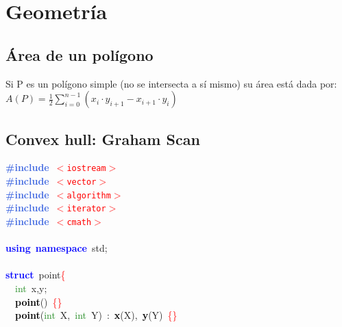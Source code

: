 \documentclass[10pt,a4paper,twoside]{article}
\begin{document}
{{{{{{{{{} \normalfont\normalsize

\section{Geometría}
\subsection{Área de un polígono}
Si P es un polígono simple (no se intersecta a sí mismo) su área está dada por: \\

$ A(P) = \frac{1}{2} \displaystyle\sum_{i=0}^{n-1} (x_{i} \cdot y_{i+1} - x_{i+1} \cdot y_{i}) $ \\

\subsection{Convex hull: Graham Scan}
{\ttfamily \raggedright {
\noindent
\mbox{}\textbf{\textcolor{RoyalBlue}{\#include}}\ \texttt{\textcolor{Red}{$<$iostream$>$}} \\
\mbox{}\textbf{\textcolor{RoyalBlue}{\#include}}\ \texttt{\textcolor{Red}{$<$vector$>$}} \\
\mbox{}\textbf{\textcolor{RoyalBlue}{\#include}}\ \texttt{\textcolor{Red}{$<$algorithm$>$}} \\
\mbox{}\textbf{\textcolor{RoyalBlue}{\#include}}\ \texttt{\textcolor{Red}{$<$iterator$>$}} \\
\mbox{}\textbf{\textcolor{RoyalBlue}{\#include}}\ \texttt{\textcolor{Red}{$<$cmath$>$}} \\
\mbox{} \\
\mbox{}\textbf{\textcolor{Blue}{using}}\ \textbf{\textcolor{Blue}{namespace}}\ std\textcolor{BrickRed}{;} \\
\mbox{} \\
\mbox{}\textbf{\textcolor{Blue}{struct}}\ point\textcolor{Red}{\{} \\
\mbox{}\ \ \textcolor{ForestGreen}{int}\ x\textcolor{BrickRed}{,}y\textcolor{BrickRed}{;} \\
\mbox{}\ \ \textbf{\textcolor{Black}{point}}\textcolor{BrickRed}{()}\ \textcolor{Red}{\{\}} \\
\mbox{}\ \ \textbf{\textcolor{Black}{point}}\textcolor{BrickRed}{(}\textcolor{ForestGreen}{int}\ X\textcolor{BrickRed}{,}\ \textcolor{ForestGreen}{int}\ Y\textcolor{BrickRed}{)}\ \textcolor{BrickRed}{:}\ \textbf{\textcolor{Black}{x}}\textcolor{BrickRed}{(}X\textcolor{BrickRed}{),}\ \textbf{\textcolor{Black}{y}}\textcolor{BrickRed}{(}Y\textcolor{BrickRed}{)}\ \textcolor{Red}{\{\}} \\
}}}}}}}}}}
\end{document}
